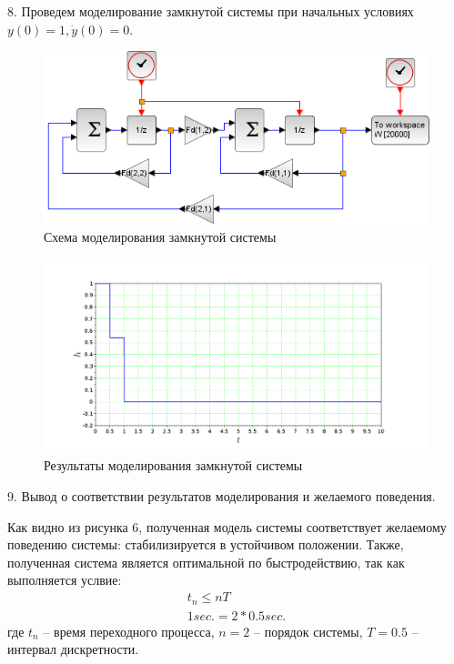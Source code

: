 \documentclass[a4paper,14pt]{extreport}
\begin{document}
	8. Проведем моделирование замкнутой системы при начальных условиях $y(0) = 1, \dot y(0) = 0$.
	\begin{figure}[H]
		\center\includegraphics[width=0.7\linewidth]{model_fd.png}
		\caption{Схема моделирования замкнутой системы}
		\label{fig:scr1}
	\end{figure}
	\begin{figure}[H]
		\center\includegraphics[width=0.7\linewidth]{model_fd_res.png}
		\caption{Результаты моделирования замкнутой системы}
		\label{fig:scr1}
	\end{figure}
	
	9. Вывод о соответствии результатов моделирования и
	желаемого поведения.
	
	Как видно из рисунка 6, полученная модель системы соответствует
	желаемому поведению системы: стабилизируется в устойчивом положении.
	Также, полученная система является оптимальной по быстродействию, так как выполняется услвие:
	\begin{align}
	t_n \le nT\\
	1 sec. = 2 * 0.5 sec.
	\end{align}
	где $t_n$ -- время переходного процесса, $n = 2$ -- порядок системы, $T = 0.5$ --
	интервал дискретности.
	
\end{document}
